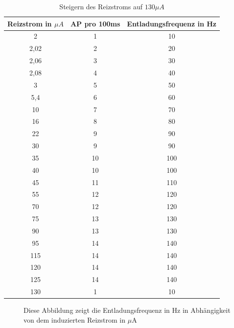 \documentclass[11pt]{article}
\begin{document}
\begin{table}[H]
\caption{Steigern des Reizstroms auf $130 \mu A$}
\begin{center}
\begin{tabular}{c|c|c}
Reizstrom in $\mu A$ & AP pro 100ms & Entladungsfrequenz in Hz \\
\hline\hline
2	&	1	&	10	\\
2,02	&	2	&	20	\\
2,06	&	3	&	30	\\
2,08	&	4	&	40	\\
3	&	5	&	50	\\
5,4	&	6	&	60	\\
10	&	7	&	70	\\
16	&	8	&	80	\\
22	&	9	&	90	\\
30	&	9	&	90	\\
35	&	10	&	100	\\
40	&	10	&	100	\\
45	&	11	&	110	\\
55	&	12	&	120	\\
70	&	12	&	120	\\
75	&	13	&	130	\\
90	&	13	&	130	\\
95	&	14	&	140	\\
115	&	14	&	140	\\
120	&	14	&	140	\\
125	&	14	&	140	\\
130	&	1	&	10	
\end{tabular}
\end{center}
\label{werte224}
\end{table}
\begin{figure}[H]
\caption{Diese Abbildung zeigt  die Entladungsfrequenz in Hz in Abhängigkeit von dem induzierten Reizstrom in $\mu$A}
\label{plot-a2}
\end{figure}
\end{document}
